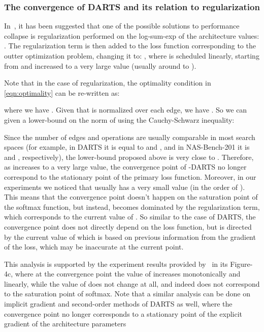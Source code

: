 \documentclass{article} \usepackage{fancyhdr, iclr2023_conference, times}
\begin{document}
\subsubsection{The convergence of DARTS and its relation to  regularization}
\label{sec:l2-reg}
\par In~\citep{DBLP:journals/corr/abs-2203-01665}, it has been suggested that one of the possible solutions to performance collapse is  regularization performed on the log-sum-exp of the architecture values: . The regularization term is then added to the loss function corresponding to the outter optimization problem, changing it to: , where  is scheduled linearly, starting from  and increased to a very large value (usually around  to ). 
\par Note that in the case of  regularization, the optimality condition in \ref{eqn:optimality} can be re-written as:

where we have . Given that  is normalized over each edge, we have . So we can given a lower-bound on the  norm of  using the Cauchy-Schwarz inequality:

Since the number of edges and operations are usually comparable in most search spaces (for example, in DARTS it is equal to  and , and in NAS-Bench-201 it is  and , respectively), the lower-bound proposed above is very close to . Therefore, as  increases to a very large value, the convergence point of -DARTS no longer correspond to the stationary point of the primary loss function. Moreover, in our experiments we noticed that  usually has a very small value (in the order of ). This means that the convergence point doesn't happen on the saturation point of the softmax function, but instead, becomes dominated by the regularization term, which corresponds to the current value of . So similar to the case of DARTS, the convergence point does not directly depend on the loss function, but is directed by the current value of  which is based on previous information from the gradient of the loss, which may be inaccurate at the current point.
\par This analysis is supported by the experiment results provided by~\citep{DBLP:journals/corr/abs-2203-01665} in its Figure-4c, where at the convergence point the value of  increases monotonically and linearly, while the value of  does not change at all, and indeed does not correspond to the saturation point of softmax. Note that a similar analysis can be done on implicit gradient and second-order methods of DARTS as well, where the convergence point no longer corresponds to a stationary point of the explicit gradient of the architecture parameters
\end{document}
